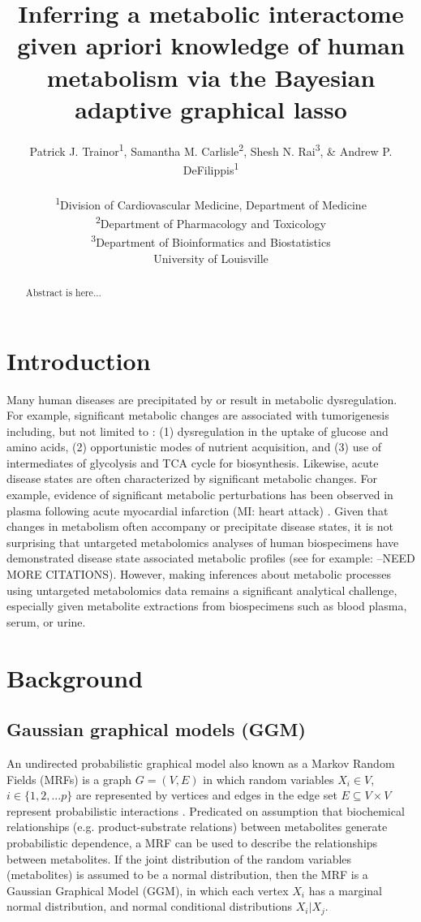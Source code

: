 \documentclass[11pt]{article}
\title{Inferring a metabolic interactome given apriori knowledge of human metabolism via the Bayesian adaptive graphical lasso}
\author{Patrick J. Trainor\textsuperscript{1}, Samantha M. Carlisle\textsuperscript{2}, Shesh N. Rai\textsuperscript{3}, \& Andrew P. DeFilippis\textsuperscript{1}\\ \\
	\textsuperscript{1}Division of Cardiovascular Medicine, Department of Medicine\\
	\textsuperscript{2}Department of Pharmacology and Toxicology\\
	\textsuperscript{3}Department of Bioinformatics and Biostatistics
\\
University of Louisville}
\date{}
\begin{document}
	
\maketitle

\begin{abstract}
Abstract is here...
\end{abstract}

\section{Introduction}
Many human diseases are precipitated by or result in metabolic dysregulation. For example, significant metabolic changes are associated with tumorigenesis including, but not limited to \citealp{pavlova2016}: (1) dysregulation in the uptake of glucose and amino acids, (2) opportunistic modes of nutrient acquisition, and (3) use of intermediates of glycolysis and TCA cycle for biosynthesis. Likewise, acute disease states are often characterized by significant metabolic changes. For example, evidence of significant metabolic perturbations has been observed in plasma following acute myocardial infarction (MI: heart attack) \citep{trainor2017}. Given that changes in metabolism often accompany or precipitate disease states, it is not surprising that untargeted metabolomics analyses of human biospecimens have demonstrated disease state associated metabolic profiles (see for example: \citep{defilippis2017}--NEED MORE CITATIONS). However, making inferences about metabolic processes using untargeted metabolomics data remains a significant analytical challenge, especially given metabolite extractions from biospecimens such as blood plasma, serum, or urine. 

\section{Background}

\subsection{Gaussian graphical models (GGM)}
An undirected probabilistic graphical model also known as a Markov Random Fields (MRFs) is a graph $G=(V,E)$ in which random variables $X_i\in V$, $i\in \{1,2,...p\}$ are represented by vertices and edges in the edge set $E \subseteq V \times V$ represent probabilistic interactions  \citep{koller2009}. Predicated on assumption that biochemical relationships (e.g. product-substrate relations) between metabolites generate probabilistic dependence,  a MRF can be used to describe the relationships between metabolites. If the joint distribution of the random variables (metabolites) is assumed to be a normal distribution, then the MRF is a Gaussian Graphical Model (GGM), in which each vertex $X_i$ has a marginal normal distribution, and normal conditional distributions $X_i|X_j$. 
\end{document}
